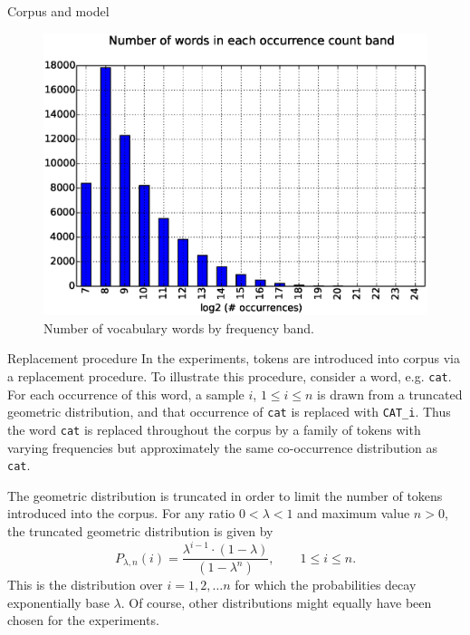 \documentclass{article} %
\newcommand{\word}[1]{\texttt{#1}}
\begin{document}
\begin{section}{Corpus and model}
\begin{figure}\label{fig:frequency-histogram}
	\includegraphics[scale=0.5]{occurrence-histogram}
	\caption{
	Number of vocabulary words by frequency band.
	}
\end{figure}

\begin{subsection}{Replacement procedure}\label{replacement-procedure}
In the experiments, tokens are introduced into corpus via a replacement procedure.
To illustrate this procedure, consider a word, e.g. \word{cat}.
For each occurrence of this word, a sample $i$, $1 \leqslant i \leqslant n$ is drawn from a truncated geometric distribution, and that occurrence of \word{cat} is replaced with \word{CAT\_i}.
Thus the word \word{cat} is replaced throughout the corpus by a family of tokens with varying frequencies but approximately the same co-occurrence distribution as \word{cat}.

The geometric distribution is truncated in order to limit the number of tokens introduced into the corpus.
For any ratio $0 < \lambda < 1$ and maximum value $n > 0$, the truncated geometric distribution is given by
$$ P_{\lambda, n} (i) = \frac{\lambda^{i-1} \cdot (1-\lambda)}{(1 - \lambda^n)}, \qquad 1 \leqslant i \leqslant n.$$ 
This is the distribution over $i = 1, 2, \dots n$ for which the probabilities decay exponentially base $\lambda$.
Of course, other distributions might equally have been chosen for the experiments.
\end{subsection}
\end{section}
\end{document}
